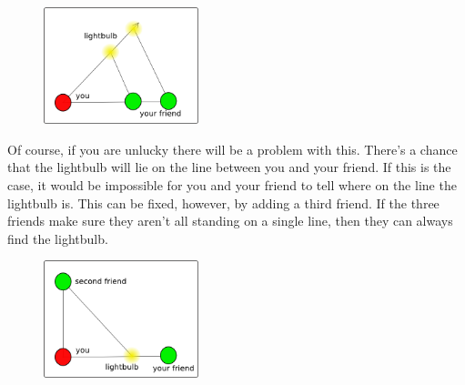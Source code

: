 	\begin{figure}[H]
	   \centering
	   \includegraphics[width=0.4\textwidth]{season1/110/images/drawing2.png} 
	\end{figure}

Of course, if you are unlucky there will be a problem with this. There's a chance that the lightbulb will lie on the line between you and your friend. If this is the case, it would be impossible for you and your friend to tell where on the line the lightbulb is. This can be fixed, however, by adding a third friend. If the three friends make sure they aren't all standing on a single line, then they can always find the lightbulb. \\

	\begin{figure}[H]
	   \centering
	   \includegraphics[width=0.4\textwidth]{season1/110/images/drawing3.png} 
	\end{figure}


